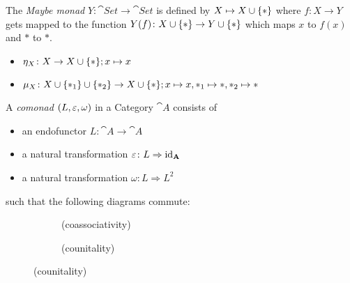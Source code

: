\begin{example}
    The \textit{Maybe monad} $Y \colon \cat{Set} \to \cat{Set}$ is defined by
    $X \mapsto X \cup \{\ast\}$ where $f \colon X \to Y$ gets mapped to the function
    $Y(f) \colon X \cup \{\ast\} \to Y \cup \{\ast\}$ which maps $x$ to $f(x)$ and $\ast$ to $\ast$. 
    \begin{itemize}
        \item $\eta_X \colon X \to X \cup \{\ast\}; x \mapsto x$
        \item $\mu_X \colon X \cup \{\ast_1\}  \cup \{\ast_2\} \to X \cup \{\ast\}; x \mapsto x, 
        \ast_1 \mapsto \ast, \ast_2 \mapsto \ast$
    \end{itemize}
\end{example}

\begin{definition}[comonad]
A \textit{comonad} $(L,\varepsilon, \omega) $ in a Category $\cat{A}$ consists of
\begin{itemize}
    \item an endofunctor $L\colon \cat{A} \to \cat{A}$
    \item a natural transformation $\varepsilon \colon L \Rightarrow \operatorname{id}_{\mathbf{A}}$ 
    \item a natural transformation $\omega\colon L \Rightarrow L^2 $
\end{itemize}  
such that the following diagrams commute:

\begin{figure}[H]
\centering
\begin{subfigure}{0.4\textwidth}
\centering
\caption*{(coassociativity)}
\end{subfigure}
\hspace{2em}
\begin{subfigure}{0.4\textwidth}
\centering
\caption*{(counitality)}
\end{subfigure}
\end{figure}



\end{definition}
